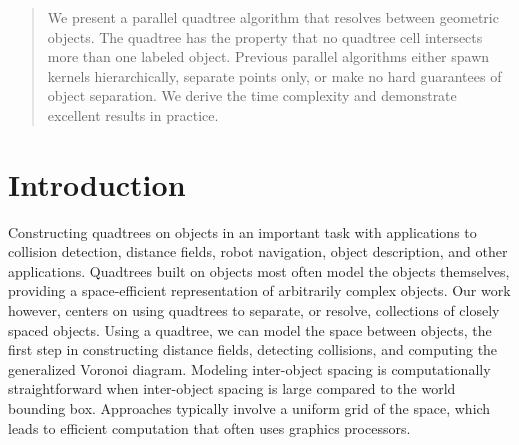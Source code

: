 \documentclass[submission]{gmp2017}
\begin{document}
\begin{abstract}
We present a parallel quadtree algorithm that resolves between geometric objects. The quadtree has the property that no quadtree cell intersects more than one labeled object. Previous parallel algorithms either spawn kernels hierarchically, separate points only, or make no hard guarantees of object separation. We derive the time complexity and demonstrate excellent results in practice.



\end{abstract}


\section{Introduction}
\label{sec:intro}
Constructing quadtrees on objects in an important task with applications to collision detection, distance fields, robot navigation, object description, and other applications. Quadtrees built on objects most often model the objects themselves, providing a space-efficient representation of arbitrarily complex objects. Our work however, centers on using quadtrees to separate, or resolve, collections of closely spaced objects. Using a quadtree, we can model the space between objects, the first step in constructing distance fields, detecting collisions, and computing the generalized Voronoi diagram. Modeling inter-object spacing is computationally straightforward when inter-object spacing is large compared to the world bounding box. Approaches typically involve a uniform grid of the space, which leads to efficient computation that often uses graphics processors.
\end{document}
